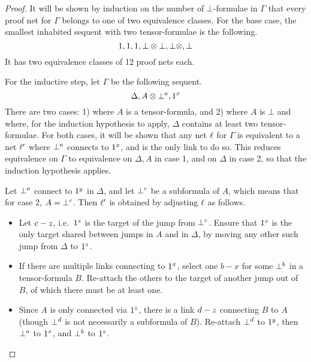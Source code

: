 \begin{proof}
%
It will be shown by induction on the number of $\bot$-formulae in $\Gamma$ that every proof net for $\Gamma$ belongs to one of two equivalence classes.
%
For the base case, the smallest inhabited sequent with two tensor-formulae is the following.
\[
	\1,\1,\1,\bot\tn\bot,\bot\tn,\bot
\]
It has two equivalence classes of 12 proof nets each.



For the inductive step, let $\Gamma$ be the following sequent.
\[
	\Delta,A\tn\named a\bot,\named x\1
\]
There are two cases: 1) where $A$ is a tensor-formula, and 2) where $A$ is $\bot$ and where, for the induction hypothesis to apply, $\Delta$ contains at least two tensor-formulae.
%
For both cases, it will be shown that any net $\links$ for $\Gamma$ is equivalent to a net $\links'$ where $\named a\bot$ connects to $\named x1$, and is the only link to do so.
%
This reduces equivalence on $\Gamma$ to equivalence on $\Delta,A$ in case 1, and on $\Delta$ in case 2, so that the induction hypothesis applies.


Let $\named a\bot$ connect to $\named y\1$ in $\Delta$, and let $\named c\bot$ be a subformula of $A$, which means that for case 2, $A=\named c\bot$.
%
Then $\links'$ is obtained by adjusting $\links$ as follows.
\begin{itemize}

	\item
Let $\edge cz$, i.e.\ $\named z\1$ is the target of the jump from $\named c\bot$.	
%
Ensure that $\named z\1$ is the only target shared between jumps in $A$ and in $\Delta$, by moving any other such jump from $\Delta$ to $\named z\1$.

	\item
If there are multiple links connecting to $\named x\1$, select one $b-x$ for some $\named b\bot$ in a tensor-formula $B$.
%
Re-attach the others to the target of another jump out of $B$, of which there must be at least one.

	\item
Since $A$ is only connected via $\named z\1$, there is a link $\edge dz$ connecting $B$ to $A$ (though $\named d\bot$ is not necessarily a subformula of $B$).
%
Re-attach $\named d\bot$ to $\named y\1$, then $\named a\bot$ to $\named x\1$, and $\named b\bot$ to $\named z\1$.

\end{itemize}

\end{proof}




